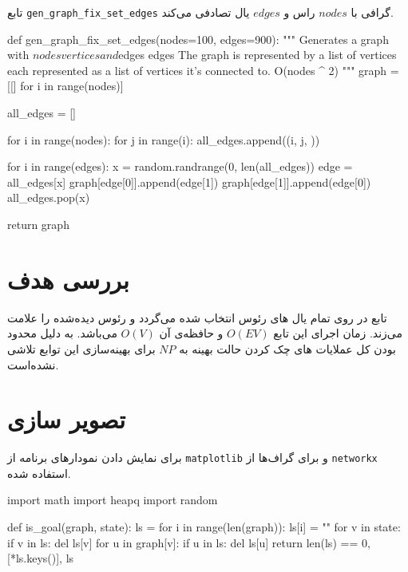 تابع
\verb;gen_graph_fix_set_edges;
گرافی با
$nodes$
راس و  
$edges$
یال تصادفی می‌کند.

\begin{latin}
\begin{python}
def gen_graph_fix_set_edges(nodes=100, edges=900):
    """
    Generates a graph with $nodes vertices and $edges edges
    The graph is represented by a list of vertices each represented as a list of vertices it's connected to.
    O(nodes ^ 2)
    """
    graph = [[] for i in range(nodes)]

    all_edges = []
    
    for i in range(nodes):
        for j in range(i):
            all_edges.append((i, j, ))

    for i in range(edges):
        x = random.randrange(0, len(all_edges))
        edge = all_edges[x]
        graph[edge[0]].append(edge[1])
        graph[edge[1]].append(edge[0])
        all_edges.pop(x)

    return graph

\end{python}
\end{latin}

\section{بررسی هدف}
تابع
در 
 روی تمام یال ‌های رئوس انتخاب شده می‌گردد  و رئوس دیده‌شده را علامت می‌زند.
 زمان اجرای این تابع
 $O(EV)$
 و حافظه‌ی آن
 $O(V)$
  می‌باشد.
 به دلیل محدود بودن کل عملایات های چک کردن حالت بهینه به
 $NP$
 برای بهینه‌سازی این توابع تلاشی نشده‌است.
 
 \section{تصویر سازی}
 برای نمایش دادن نمودارهای برنامه از
\verb;matplotlib;
 و برای گراف‌ها از
\verb;networkx;
استفاده شده.
 
 \begin{latin}
 \begin{python}
 import math
import heapq
import random

def is_goal(graph, state):
    ls = {}
    for i in range(len(graph)):
        ls[i] = ""
    for v in state:
        if v in ls:
            del ls[v]
        for u in graph[v]:
            if u in ls:
                del ls[u]
    return len(ls) == 0, [*ls.keys()], ls

 \end{python}
 \end{latin}

